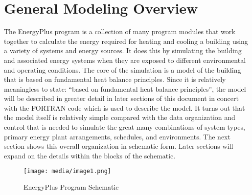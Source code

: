 \section{General Modeling Overview}\label{general-modeling-overview}

The EnergyPlus program is a collection of many program modules that work together to calculate the energy required for heating and cooling a building using a variety of systems and energy sources. It does this by simulating the building and associated energy systems when they are exposed to different environmental and operating conditions. The core of the simulation is a model of the building that is based on fundamental heat balance principles. Since it is relatively meaningless to state: ``based on fundamental heat balance principles'', the model will be described in greater detail in later sections of this document in concert with the FORTRAN code which is used to describe the model. It turns out that the model itself is relatively simple compared with the data organization and control that is needed to simulate the great many combinations of system types, primary energy plant arrangements, schedules, and environments. The next section shows this overall organization in schematic form. Later sections will expand on the details within the blocks of the schematic.

\begin{figure}[hbtp] %
\centering
\texttt{[image: media/image1.png]}
\caption{EnergyPlus Program Schematic \protect \label{fig:energyplus-program-schematic}}
\end{figure}
